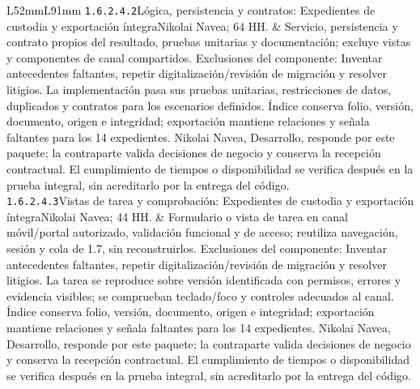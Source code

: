 \begin{longtable}{L{52mm}L{91mm}}
\texttt{1.\allowbreak{}6.\allowbreak{}2.\allowbreak{}4.\allowbreak{}2}\newline Lógica, persistencia y contratos: Expedientes de custodia y exportación íntegra\newline Nikolai Navea; 64 HH. & Servicio, persistencia y contrato propios del resultado, pruebas unitarias y documentación; excluye vistas y componentes de canal compartidos. Exclusiones del componente: Inventar antecedentes faltantes, repetir digitalización/revisión de migración y resolver litigios. La implementación pasa sus pruebas unitarias, restricciones de datos, duplicados y contratos para los escenarios definidos. Índice conserva folio, versión, documento, origen e integridad; exportación mantiene relaciones y señala faltantes para los 14 expedientes. Nikolai Navea, Desarrollo, responde por este paquete; la contraparte valida decisiones de negocio y conserva la recepción contractual. El cumplimiento de tiempos o disponibilidad se verifica después en la prueba integral, sin acreditarlo por la entrega del código.\\\hline
\texttt{1.\allowbreak{}6.\allowbreak{}2.\allowbreak{}4.\allowbreak{}3}\newline Vistas de tarea y comprobación: Expedientes de custodia y exportación íntegra\newline Nikolai Navea; 44 HH. & Formulario o vista de tarea en canal móvil/portal autorizado, validación funcional y de acceso; reutiliza navegación, sesión y cola de 1.7, sin reconstruirlos. Exclusiones del componente: Inventar antecedentes faltantes, repetir digitalización/revisión de migración y resolver litigios. La tarea se reproduce sobre versión identificada con permisos, errores y evidencia visibles; se comprueban teclado/foco y controles adecuados al canal. Índice conserva folio, versión, documento, origen e integridad; exportación mantiene relaciones y señala faltantes para los 14 expedientes. Nikolai Navea, Desarrollo, responde por este paquete; la contraparte valida decisiones de negocio y conserva la recepción contractual. El cumplimiento de tiempos o disponibilidad se verifica después en la prueba integral, sin acreditarlo por la entrega del código.\\\hline
\end{longtable}
\endgroup
{}
